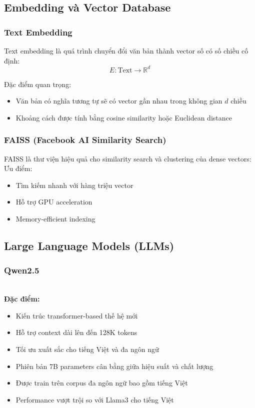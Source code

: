 \documentclass[a4paper]{article}
\begin{document}
\subsection{Embedding và Vector Database} %
\subsubsection{Text Embedding} %
Text embedding là quá trình chuyển đổi văn bản thành vector số có số chiều cố định: %
\begin{equation}
    E: \text{Text} \rightarrow \mathbb{R}^{d} %
\end{equation}

Đặc điểm quan trọng:
\begin{itemize}
    \item Văn bản có nghĩa tương tự sẽ có vector gần nhau trong không gian $d$ chiều %
    \item Khoảng cách được tính bằng cosine similarity hoặc Euclidean distance %
\end{itemize}

\subsubsection{FAISS (Facebook AI Similarity Search)} %
FAISS là thư viện hiệu quả cho similarity search và clustering của dense vectors: %
Ưu điểm:
\begin{itemize}
    \item Tìm kiếm nhanh với hàng triệu vector %
    \item Hỗ trợ GPU acceleration %
    \item Memory-efficient indexing %
\end{itemize}

\subsection{Large Language Models (LLMs)} %
\subsubsection{Qwen2.5} %
\\ %
\textbf{Đặc điểm:}
\begin{itemize}
    \item Kiến trúc transformer-based thế hệ mới %
    \item Hỗ trợ context dài lên đến 128K tokens %
    \item Tối ưu xuất sắc cho tiếng Việt và đa ngôn ngữ %
    \item Phiên bản 7B parameters cân bằng giữa hiệu suất và chất lượng %
    \item Được train trên corpus đa ngôn ngữ bao gồm tiếng Việt %
    \item Performance vượt trội so với Llama3 cho tiếng Việt %
\end{itemize}
\end{document}
